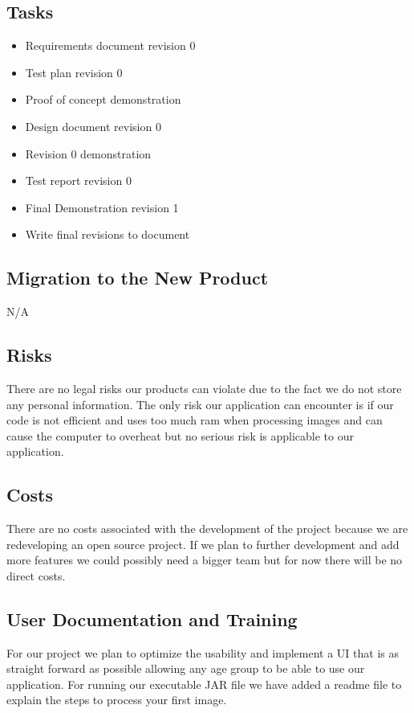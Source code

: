 \documentclass[12pt, titlepage]{article}
\begin{document}
\subsection{Tasks}

\begin{itemize}
\item Requirements document revision 0
\item Test plan revision 0
\item Proof of concept demonstration
\item Design document revision 0
\item Revision 0 demonstration
\item Test report revision 0
\item Final Demonstration revision 1  
\item Write final revisions to document
\end{itemize}

\subsection{Migration to the New Product}

N/A

\subsection{Risks}

There are no legal risks our products can violate due to the fact we do not store any personal information. The only risk our application can encounter is if our code is not efficient and uses too much ram when processing images and can cause the computer to overheat but no serious risk is applicable to our application.

\subsection{Costs}

There are no costs associated with the development of the project because we are redeveloping an open source project. If we plan to further development and add more features we could possibly need a bigger team but for now there will be no direct costs.

\subsection{User Documentation and Training}

For our project we plan to optimize the usability and implement a UI that is as straight forward as possible allowing any age group to be able to use our application. For running our executable JAR file we have added a readme file to explain the steps to process your first image.
\end{document}
